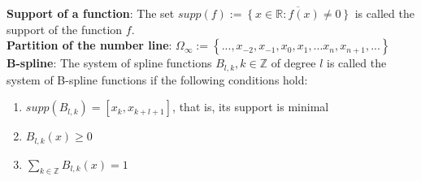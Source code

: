 \documentclass[margin=0px]{article}
\begin{document}
\noindent \textbf{Support of a function}: The set $supp(f) := \overline{\left\{x \in \mathbb{R}: f(x) \not = 0 \right\}}$ is called
the support of the function $f$.\\

\noindent \textbf{Partition of the number line}: $\Omega_{\infty} := \left\{...,x_{-2},x_{-1},x_{0},x_{1},...x_{n},x_{n+1},...\right\}$\\

\noindent \textbf{B-spline}: The system of spline functions $B_{l,k}, k \in \mathbb{Z}$ of degree $l$ is called the system of B-spline functions
if the following conditions hold:
\begin{enumerate}
    \item	$supp(B_{l,k}) = [x_{k},x_{k+l+1}]$, that is, its support is minimal

    \item	$B_{l,k}(x) \geq 0$

    \item	$\displaystyle\sum_{k \in \mathbb{Z}}B_{l,k}(x) = 1$
\end{enumerate}
\end{document}
